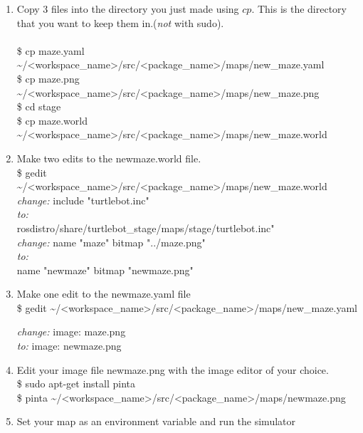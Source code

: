 \documentclass[12pt]{article}
\newcommand{\R}{\color{red}}
\newcommand{\K}{\color{black}}
\newcommand{\G}{\color{mygreen}}
\newcommand{\pkgname}{\G<package\_name>\K}
\newcommand{\wspname}{\R<workspace\_name>\K}
\newcommand{\home}{\textasciitilde/}
\newcommand{\rosdistro}{kinetic}
\begin{document}
\begin{enumerate}
    \item Copy 3 files into the directory you just made using $cp$. This is the directory that you want to keep them in.({\it not} with sudo).\\ \vspace{1mm}\\
        {\selectfont    
        \$ cp maze.yaml \home\wspname/src/\pkgname/maps/new\_maze.yaml \\
        \$ cp maze.png \home\wspname/src/\pkgname/maps/new\_maze.png \\
        \$ cd stage \\
        \$ cp maze.world \home\wspname/src/\pkgname/maps/new\_maze.world }    
	\item Make two edits to the new\textunderscore maze.world file.\\
	{\selectfont    
        \$ gedit \home\wspname/src/\pkgname/maps/new\_maze.world}\\
        {\it change:}
            {\selectfont
			include "turtlebot.inc" } \\
		{\it to:}
            {\selectfont
			\\rosdistro/share/turtlebot\_stage/maps/stage/turtlebot.inc" } \\
		{\it change:}
            {\selectfont
			name "maze"
		  	bitmap "../maze.png" } \\
		{\it to:}\\
            {\selectfont
			name "new\textunderscore maze"
		  	bitmap "new\textunderscore maze.png" }\\
	\item Make one edit to the new\textunderscore maze.yaml file\\
	{\selectfont    
        \$ gedit \home\wspname/src/\pkgname/maps/new\_maze.yaml}

		{\it change:} 
            {\selectfont
			image: maze.png } \\
		{\it to: }
            {\selectfont
			image: new\textunderscore maze.png } 
	\item Edit your image file new\textunderscore maze.png with the image editor of your choice.\\
{\selectfont \$ sudo apt-get install pinta }\\
    {\selectfont \$ pinta \home\wspname/src/\pkgname/maps/new\textunderscore maze.png }
	\item Set your map as an environment variable and run the simulator
	

\end{enumerate}
\end{document}
